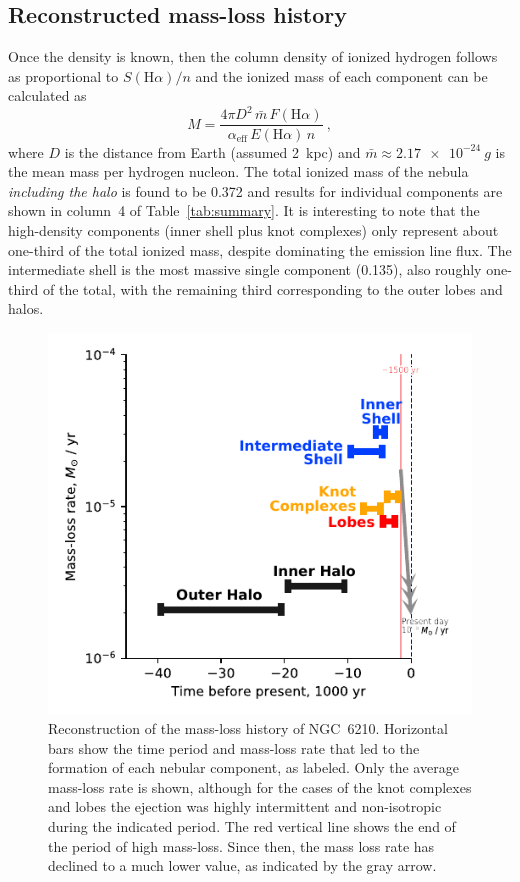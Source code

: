 \documentclass[useAMS, usenatbib]{mnras}
\newcommand\Ha{\ensuremath{\mathrm{H}\alpha}}
\begin{document}
\subsection{Reconstructed mass-loss history}
\label{sec:reconstr-mass-loss}

Once the density is known, then the column density of ionized hydrogen follows as proportional to \(S(\Ha)/n\) and 
the ionized mass of each component can be calculated as
\begin{equation}
  \label{eq:mass}
  M = \frac{4\pi D^2\, \bar{m}\, F(\Ha) }{\alpha_{\text{eff}}\, E(\Ha)\, n} \ , 
\end{equation}
where \(D\) is the distance from Earth (assumed \SI{2}{kpc}) and \(\bar{m} \approx \SI{2.17e-24}{g}\) is the mean mass per hydrogen nucleon.
The total ionized mass of the nebula \emph{including the halo} is found to be \SI{0.372}{\msun} and results for individual components are shown in column~4 of Table~\ref{tab:summary}.
It is interesting to note that the high-density components (inner shell plus knot complexes)
only represent about one-third of the total ionized mass,
despite dominating the emission line flux.
The intermediate shell is the most massive single component (\SI{0.135}{\msun}),
also roughly one-third of the total,
with the remaining third corresponding to the outer lobes and halos.

\begin{figure}
  \includegraphics[width=\linewidth]
  {figs/mass-loss-history-annotated}
  \caption{
    Reconstruction of the mass-loss history of NGC~6210.
    Horizontal bars show the time period and mass-loss rate that led to the formation of each nebular component, as labeled.
    Only the average mass-loss rate is shown,
    although for the cases of the knot complexes and lobes the ejection was highly intermittent and non-isotropic during the indicated period.
    The red vertical line shows the end of the period of high mass-loss.
    Since then, the mass loss rate has declined to a much lower value, as indicated by the gray arrow.
  }
  \label{fig:mass-loss-history}
\end{figure}
\end{document}
